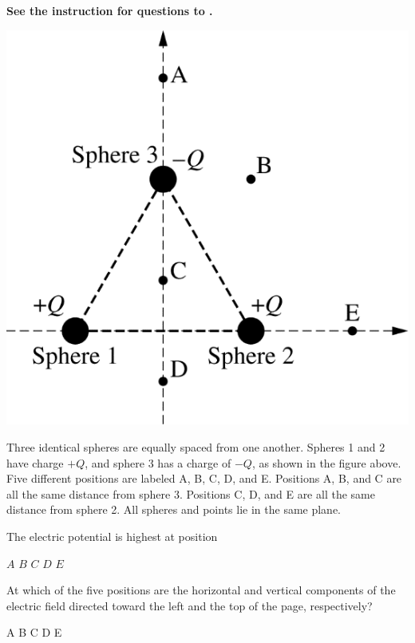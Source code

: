 
\textbf{See the instruction for questions  to .} 

\begin{center}
    \includegraphics[scale=0.3]{images/img-010-018.png}
\end{center}

Three identical spheres are equally spaced from one another. Spheres 1 and 2 have charge $+Q$, and sphere 3 has a charge of $-Q$, as shown in the figure above. Five different positions are labeled A, B, C, D, and E. Positions A, B, and C are all the same distance from sphere 3. Positions C, D, and E are all the same distance from sphere 2. All spheres and points lie in the same plane.

\begin{questions}
\setcounter{question}{16}
\question
The electric potential is highest at position

\begin{oneparchoices}
    \choice $A$
    \choice $B$
    \choice $C$
    \choice $D$
    \choice $E$
\end{oneparchoices}
\end{questions}

\begin{questions}
\setcounter{question}{17}
\question
At which of the five positions are the horizontal and vertical components of the electric field directed toward the left and the top of the page, respectively?

\begin{oneparchoices}
    \choice A
    \choice B
    \choice C
    \choice D
    \choice E
\end{oneparchoices}
\end{questions}
